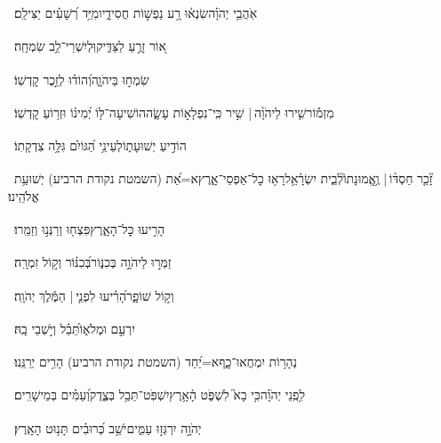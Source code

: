 \documentclass[12pt]{article}
\newcommand{\loc}[1]{\textsuperscript{\locf{#1}}}
\begin{document}
{\loc{ י}~}‏אֹֽהֲבֵ֥י יְהֹוָ֗ה{\hfill}שִׂנְא֫וּ רָ֥ע\newline\hspace*{.5em} נַפְשׁ֣וֹת חֲסִידָ֑יו{\hfill}מִיַּ֥ד רְ֝שָׁעִ֗ים יַצִּילֵֽם׃\par

{\loc{ יא}~}‏א֭וֹר זָרֻ֣עַ לַצַּדִּ֑יק{\hfill}וּֽלְיִשְׁרֵי־לֵ֥ב שִׂמְחָֽה׃\par

{\loc{ יב}~}‏שִׂמְח֣וּ  בַּיהֹוָ֑ה{\hfill}וְ֝הוֹד֗וּ לְזֵ֣כֶר קׇדְשֽׁוֹ׃\par\pend
\ledpb
\pstart[\subsection*{\textcolor{red}{פרק צח}}]\label{פרק צח}
{\loc{ א}~}‏מִזְמ֡וֹר\newline\hspace*{.5em}שִׁ֤ירוּ לַיהֹוָ֨ה |  שִׁ֣יר {\hfill}כִּֽי־נִפְלָא֣וֹת עָשָׂ֑ה\newline\hspace*{.5em}הוֹשִׁיעָה־לּ֥וֹ יְ֝מִינ֗וֹ וּזְר֥וֹעַ קׇדְשֽׁוֹ׃\par

{\loc{ ב}~}‏הוֹדִ֣יעַ  יְשׁוּעָת֑וֹ{\hfill}לְעֵינֵ֥י הַ֝גּוֹיִ֗ם גִּלָּ֥ה צִדְקָתֽוֹ׃\par

{\loc{ ג}~}‏זָ֘כַ֤ר חַסְדּ֨וֹ |  וֶ֥אֱֽמוּנָתוֹ֮{\hfill}לְבֵ֢ית יִשְׂרָ֫אֵ֥ל\newline\hspace*{.5em}רָא֥וּ כׇל־אַפְסֵי־אָ֑רֶץ{\hfill}א=אֵ֝ת (השמטת נקודת הרביע) יְשׁוּעַ֥ת אֱלֹהֵֽינוּ׃\par

{\loc{ ד}~}‏הָרִ֣יעוּ  כׇּל־הָאָ֑רֶץ{\hfill}פִּצְח֖וּ וְרַנְּנ֣וּ וְזַמֵּֽרוּ׃\par

{\loc{ ה}~}‏זַמְּר֣וּ לַיהֹוָ֣ה בְּכִנּ֑וֹר{\hfill}בְּ֝כִנּ֗וֹר וְק֣וֹל זִמְרָֽה׃\par

{\loc{ ו}~}‏ וְק֣וֹל שׁוֹפָ֑ר{\hfill}הָ֝רִ֗יעוּ לִפְנֵ֤י |  הַמֶּ֬לֶךְ יְהֹוָֽה׃\par

{\loc{ ז}~}‏יִרְעַ֣ם  וּמְלֹא֑וֹ{\hfill}תֵּ֝בֵ֗ל וְיֹ֣שְׁבֵי בָֽהּ׃\par

{\loc{ ח}~}‏נְהָר֥וֹת יִמְחֲאוּ־כָ֑ף{\hfill}א=יַ֝חַד (השמטת נקודת הרביע) הָרִ֥ים יְרַנֵּֽנוּ׃\par

{\loc{ ט}~}‏לִ֥פְֽנֵי יְהֹוָ֗ה{\hfill}כִּ֥י בָא֮ לִשְׁפֹּ֢ט הָ֫אָ֥רֶץ\newline\hspace*{.5em}יִשְׁפֹּֽט־תֵּבֵ֥ל בְּצֶ֑דֶק{\hfill}וְ֝עַמִּ֗ים בְּמֵישָׁרִֽים׃\par\pend
\ledpb
\pstart[\subsection*{\textcolor{red}{פרק צט}}]\label{פרק צט}
{\loc{ א}~}‏יְהֹוָ֣ה  יִרְגְּז֣וּ עַמִּ֑ים{\hfill}יֹשֵׁ֥ב כְּ֝רוּבִ֗ים תָּנ֥וּט הָאָֽרֶץ׃\par
\end{document}
